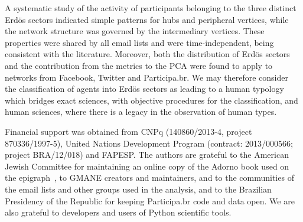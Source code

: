 \documentclass[%
	aip,
	jmp,%
	amsmath,amssymb,
	reprint,%
]{revtex4-1}
\begin{document}
A systematic study of the activity of participants belonging to the three distinct Erd\"os sectors indicated simple patterns for hubs and peripheral vertices, while the network structure was governed by the intermediary vertices. These properties were shared by all email lists and were time-independent, being consistent with the literature. Moreover, both the distribution of Erd\"os sectors and the contribution from the metrics to the PCA were found to apply to networks from Facebook, Twitter and Participa.br. We may therefore consider the classification of agents into Erd\"os sectors as leading to a human typology which bridges exact sciences, with objective procedures for the classification, and human sciences, where there is a legacy in the observation of human types. 


\begin{acknowledgments}
	Financial support was obtained from CNPq (140860/2013-4,
	project 870336/1997-5), United Nations Development Program (contract: 2013/000566; project BRA/12/018) and FAPESP. 
	The authors are grateful to the American Jewish Committee for maintaining an online copy of the Adorno book used on the epigraph~\cite{adorno}, to GMANE creators and maintainers, and to the communities of the email lists and other groups used in the analysis, and to the Brazilian Presidency of the Republic for keeping Participa.br code and data open.
	We are also grateful to developers and users of Python scientific tools.
\end{acknowledgments}


\end{document}
